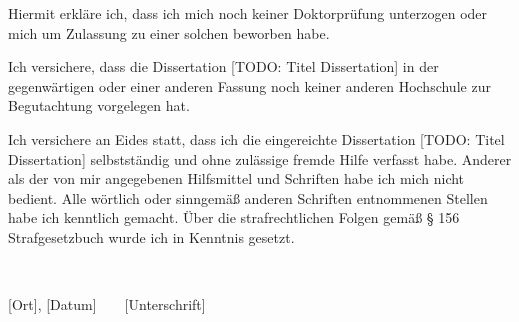 \documentclass[
]{scrbook}
\begin{document}
Hiermit erkläre ich, dass ich mich noch keiner Doktorprüfung unterzogen oder mich um Zulassung zu einer solchen beworben habe.

Ich versichere, dass die Dissertation {[}TODO: Titel Dissertation{]} in der gegenwärtigen oder einer anderen Fassung noch keiner anderen Hochschule zur Begutachtung vorgelegen hat.

Ich versichere an Eides statt, dass ich die eingereichte Dissertation {[}TODO: Titel Dissertation{]} selbstständig und ohne zulässige fremde Hilfe verfasst habe. Anderer als der von mir angegebenen Hilfsmittel und Schriften habe ich mich nicht bedient. Alle wörtlich oder sinngemäß anderen Schriften entnommenen Stellen habe ich kenntlich gemacht. Über die strafrechtlichen Folgen gemäß § 156 Strafgesetzbuch wurde ich in Kenntnis gesetzt.

~

{[}Ort{]}, {[}Datum{]} ~ ~ {[}Unterschrift{]}
\end{document}
